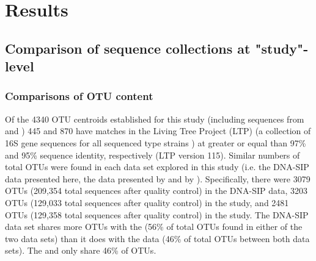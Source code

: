 \section{Results}

\subsection{Comparison of sequence collections at "study"-level}

\subsubsection{Comparisons of OTU content}
Of the 4340 OTU centroids established for this study (including sequences from \citet{Steven_2013} and \citep{Garcia_Pichel_2013}) 445 and 870 have matches in the Living Tree Project (LTP) (a collection of 16S gene sequences for all sequenced type strains \citep{Yarza_2008}) at greater or equal than 97\% and 95\% sequence identity, respectively (LTP version 115). Similar numbers of total OTUs were found in each data set explored in this study (i.e. the DNA-SIP data presented here, the data presented by \citet{Steven_2013} and by \citet{Garcia_Pichel_2013}). Specifically, there were 3079 OTUs (209,354 total sequences after quality control) in the DNA-SIP data, 3203 OTUs (129,033 total sequences after quality control) in the \citet{Garcia_Pichel_2013} study, and 2481 OTUs (129,358 total sequences after quality control) in the \citet{Steven_2013} study. The DNA-SIP data set shares more OTUs with the \citet{Steven_2013} (56\% of total OTUs found in either of the two data sets) than it does with the \citet{Garcia_Pichel_2013} data (46\% of total OTUs between both data sets). The \citet{Steven_2013} and \citet{Garcia_Pichel_2013} only share 46\% of OTUs.


